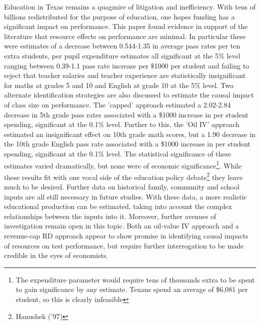 \documentclass[11pt]{article}
\begin{document}
Education in Texas remains a quagmire of litigation and inefficiency. With tens of billions redistributed for the purpose of education, one hopes funding has a significant impact on performance. This paper found evidence in support of the literature that resource effects on performance are minimal. In particular these were estimates of a decrease between 0.544-1.35 in average pass rates per ten extra students, per pupil expenditure estimates all significant at the 5\% level ranging between 0.39-1.1 pass rate increase per \$1000 per student and failing to reject that teacher salaries and teacher experience are statistically insignificant for maths at grades 5 and 10 and English at grade 10 at the 5\% level. Two alternate identification strategies are also discussed to estimate the causal impact of class size on performance. The 'capped' approach estimated a 2.02-2.84 decrease in 5th grade pass rates associated with a \$1000 increase in per student spending, significant at the 0.1\% level. Further to this, the 'Oil IV' approach estimated an insignificant effect on 10th grade math scores, but a 1.90 decrease in the 10th grade English pass rate associated with a \$1000 increase in per student spending, significant at the 0.1\% level. The statistical significance of these estimates varied dramatically, but none were of economic significance\footnote{The expenditure parameter would require tens of thousands extra to be spent to gain significance by any estimate. Texans spend an average of \$6,081 per student, so this is clearly infeasible}. While these results fit with one vocal side of the education policy debate\footnote{Hanushek ('97)} they leave much to be desired. Further data on historical family, community and school inputs are all still necessary in future studies. With these data, a more realistic educational production can be estimated, taking into account the complex relationships between the inputs into it. Moreover, further avenues of investigation remain open in this topic. Both an oil-value IV approach and a revenue-cap RD approach appear to show promise in identifying causal impacts of resources on test performance, but require further interrogation to be made credible in the eyes of economists. 






\makeatletter
\renewcommand\@biblabel[1]{}
\makeatother
\end{document}
